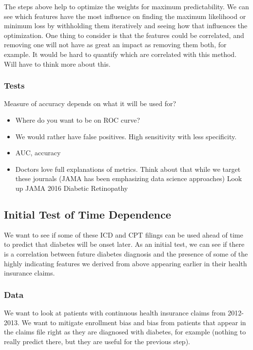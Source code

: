 \documentclass{article}
\begin{document}
The steps above help to optimize the weights for maximum predictability. We can see which features have the most influence on finding the maximum likelihood or minimum loss by withholding them iteratively and seeing how that influences the optimization. One thing to consider is that the features could be correlated, and removing one will not have as great an impact as removing them both, for example. It would be hard to quantify which are correlated with this method. Will have to think more about this. 

\subsubsection{Tests}

Measure of accuracy depends on what it will be used for?

\begin{itemize}
\item Where do you want to be on ROC curve? 
\item We would rather have false positives. High sensitivity with less specificity. 
\item AUC, accuracy 
\item Doctors love full explanations of metrics. Think about that while we target these journals (JAMA has been emphasizing data science approaches) Look up JAMA 2016 Diabetic Retinopathy
\end{itemize}

\subsection{Initial Test of Time Dependence}

We want to see if some of these ICD and CPT filings can be used ahead of time to predict that diabetes will be onset later. As an initial test, we can see if there is a correlation between future diabetes diagnosis and the presence of some of the highly indicating features we derived from above appearing earlier in their health insurance claims.

\subsubsection{Data}

We want to look at patients with continuous health insurance claims from 2012-2013. We want to mitigate enrollment bias and bias from patients that appear in the claims file right as they are diagnosed with diabetes, for example (nothing to really predict there, but they are useful for the previous step). 
\end{document}
